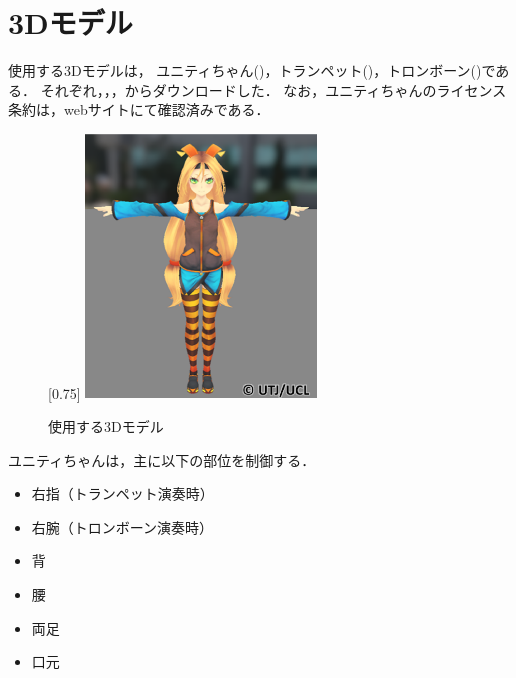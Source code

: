 \section{3Dモデル} \label{sec:3Dmodel}
使用する3Dモデルは，
ユニティちゃん()，トランペット()，トロンボーン()である．
それぞれ，\cite{unity}，\cite{tp}，\cite{tb}からダウンロードした．
なお，ユニティちゃんのライセンス条約は，webサイト\cite{license}にて確認済みである．\\
\begin{figure}[h]
	\centering
	[0.75\linewidth]{
		\includegraphics[height=7cm]{fig/chap3/unity.eps}}
	\caption{使用する3Dモデル}
	\label{fig:model}
\end{figure}
\newpage
\indent
ユニティちゃんは，主に以下の部位を制御する．
\begin{itemize}
	\item 右指（トランペット演奏時）
	\item 右腕（トロンボーン演奏時）
	\item 背
	\item 腰
	\item 両足
	\item 口元
\end{itemize}

